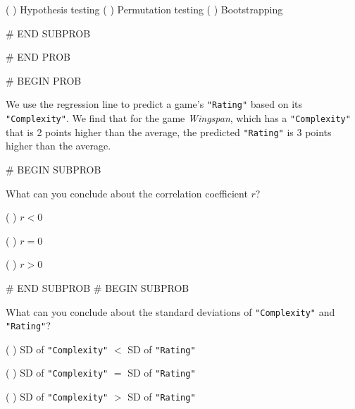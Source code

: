 \documentclass[twoside,12pt]{article}
\begin{document}
{        \begin{center}
            ( ) Hypothesis testing
            ( ) Permutation testing
            ( ) Bootstrapping           
        \end{center}
        
    

# END SUBPROB




# END PROB

\newpage
# BEGIN PROB



We use the regression line to predict a game's \texttt{"Rating"} based on its \texttt{"Complexity"}. We find that for the game \textit{Wingspan}, which has a \texttt{"Complexity"} that is 2 points higher than the average, the predicted \texttt{"Rating"} is 3 points higher than the average. 


    # BEGIN SUBPROB

 What can you conclude about the correlation coefficient $r$?

     \vspace{0.1in}
     
        ( ) $r < 0$
             
        ( ) $r = 0$
        
        ( ) $r > 0$
              
    

# END SUBPROB
    # BEGIN SUBPROB

 What can you conclude about the standard deviations of \texttt{"Complexity"} and \texttt{"Rating"}?

         \vspace{0.1in}
    
        ( ) SD of \texttt{"Complexity"} $<$ SD of \texttt{"Rating"}
        
        ( ) SD of \texttt{"Complexity"} $=$ SD of \texttt{"Rating"}
        
        ( ) SD of \texttt{"Complexity"} $>$ SD of \texttt{"Rating"}
        
    

}
\end{document}
